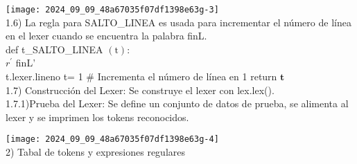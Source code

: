\documentclass[10pt]{article}
\begin{document}
\texttt{[image: 2024\_09\_09\_48a67035f07df1398e63g-3]}\\
1.6) La regla para SALTO\_LINEA es usada para incrementar el número de línea en el lexer cuando se encuentra la palabra finL.\\
def t\_SALTO\_LINEA $(\mathrm{t}):$\\
$r^{\prime}$ finL'\\
t.lexer.lineno t= 1 \# Incrementa el número de línea en 1 return $\mathbf{t}$\\
1.7) Construcción del Lexer: Se construye el lexer con lex.lex().\\
1.7.1)Prueba del Lexer: Se define un conjunto de datos de prueba, se alimenta al lexer y se imprimen los tokens reconocidos.

\texttt{[image: 2024\_09\_09\_48a67035f07df1398e63g-4]}\\
2) Tabal de tokens y expresiones regulares
\end{document}
